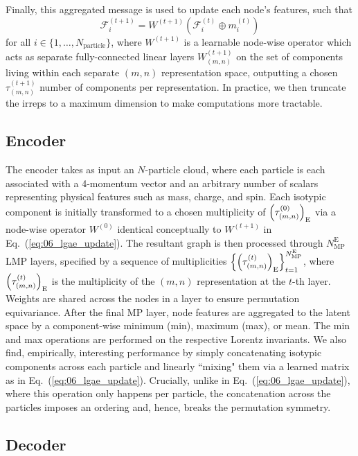 Finally, this aggregated message is used to update each node's features, such that
\begin{equation} \label{eq:06_lgae_update}
    \mathcal{F}_i^{(t+1)} = W^{(t+1)} \left( \mathcal{F}_i^{(t)} \oplus m_i^{(t)} \right)
\end{equation}
for all $i \in \{1, \ldots, N_{\mathrm{particle}}\}$, where $W^{(t+1)}$ is a learnable node-wise operator which acts as separate fully-connected linear layers $W^{(t+1)}_{(m, n)}$ on the set of components living within each separate $(m, n)$ representation space, outputting a chosen $\tau_{(m,n)}^{(t+1)}$ number of components per representation.
In practice, we then truncate the irreps to a maximum dimension to make computations more tractable.

\subsection{Encoder \label{sec:06_lgae_lgaee}}
The encoder takes as input an $N$-particle cloud, where each particle is each associated with a 4-momentum vector and an arbitrary number of scalars representing physical features such as mass, charge, and spin.
Each isotypic component is initially transformed to a chosen multiplicity of $\left( \tau_{(m, n)}^{(0)} \right)_{\mathrm{E}}$ via a node-wise operator $W^{(0)}$ identical conceptually to $W^{(t+1)}$ in Eq.~(\ref{eq:06_lgae_update}).
The resultant graph is then processed through $N_{\mathrm{MP}}^{\mathrm{E}}$ LMP layers, specified by a sequence of multiplicities $\left\{ \left( \tau_{(m, n)}^{(t)} \right)_{\mathrm{E}} \right\}_{t=1}^{N_{\mathrm{MP}}^{\mathrm{E}}}$, where $\left( \tau_{(m, n)}^{(t)} \right)_{\mathrm{E}}$ is the multiplicity of the $(m, n)$ representation at the $t$-th layer.
Weights are shared across the nodes in a layer to ensure permutation equivariance.
After the final MP layer, node features are aggregated to the latent space by a component-wise minimum (min), maximum (max), or mean.
The min and max operations are performed on the respective Lorentz invariants.
We also find, empirically, interesting performance by simply concatenating isotypic components across each particle and linearly ``mixing" them via a learned matrix as in Eq.~(\ref{eq:06_lgae_update}).
Crucially, unlike in Eq.~(\ref{eq:06_lgae_update}), where this operation only happens per particle, the concatenation across the particles imposes an ordering and, hence, breaks the permutation symmetry.


\subsection{Decoder \label{sec:06_lgae_lgaed}}

